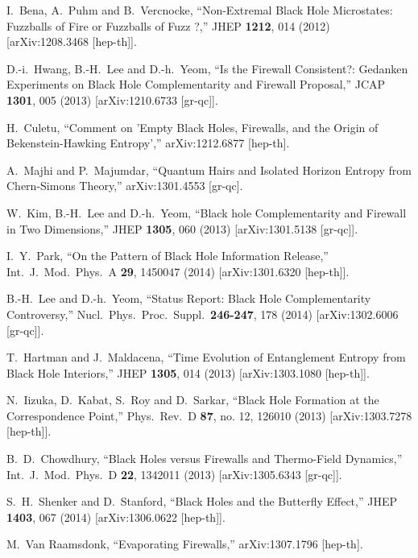 \documentclass[12pt]{article}
\begin{document}
\begin{thebibliography}{99}
  I.~Bena, A.~Puhm and B.~Vercnocke,
  ``Non-Extremal Black Hole Microstates: Fuzzballs of Fire or Fuzzballs of Fuzz ?,''
  JHEP {\bf 1212}, 014 (2012)
  [arXiv:1208.3468 [hep-th]].

  D.-i.~Hwang, B.-H.~Lee and D.-h.~Yeom,
  ``Is the Firewall Consistent?: Gedanken Experiments on Black Hole Complementarity and Firewall Proposal,''
  JCAP {\bf 1301}, 005 (2013)
  [arXiv:1210.6733 [gr-qc]].

  H.~Culetu,
  ``Comment on 'Empty Black Holes, Firewalls, and the Origin of Bekenstein-Hawking Entropy',''
  arXiv:1212.6877 [hep-th].

  A.~Majhi and P.~Majumdar,
  ``Quantum Hairs and Isolated Horizon Entropy from Chern-Simons Theory,''
  arXiv:1301.4553 [gr-qc].

  W.~Kim, B.-H.~Lee and D.-h.~Yeom,
  ``Black hole Complementarity and Firewall in Two Dimensions,''
  JHEP {\bf 1305}, 060 (2013)
  [arXiv:1301.5138 [gr-qc]].

  I.~Y.~Park,
  ``On the Pattern of Black Hole Information Release,''
  Int.\ J.\ Mod.\ Phys.\ A {\bf 29}, 1450047 (2014)
  [arXiv:1301.6320 [hep-th]].

  B.-H.~Lee and D.-h.~Yeom,
  ``Status Report: Black Hole Complementarity Controversy,''
  Nucl.\ Phys.\ Proc.\ Suppl.\  {\bf 246-247}, 178 (2014)
  [arXiv:1302.6006 [gr-qc]].

  T.~Hartman and J.~Maldacena,
  ``Time Evolution of Entanglement Entropy from Black Hole Interiors,''
  JHEP {\bf 1305}, 014 (2013)
  [arXiv:1303.1080 [hep-th]].

  N.~Iizuka, D.~Kabat, S.~Roy and D.~Sarkar,
  ``Black Hole Formation at the Correspondence Point,''
  Phys.\ Rev.\ D {\bf 87}, no. 12, 126010 (2013)
  [arXiv:1303.7278 [hep-th]].

  B.~D.~Chowdhury,
  ``Black Holes versus Firewalls and Thermo-Field Dynamics,''
  Int.\ J.\ Mod.\ Phys.\ D {\bf 22}, 1342011 (2013)
  [arXiv:1305.6343 [gr-qc]].

  S.~H.~Shenker and D.~Stanford,
  ``Black Holes and the Butterfly Effect,''
  JHEP {\bf 1403}, 067 (2014)
  [arXiv:1306.0622 [hep-th]].

  M.~Van Raamsdonk,
  ``Evaporating Firewalls,''
  arXiv:1307.1796 [hep-th].


\end{thebibliography}
\end{document}
